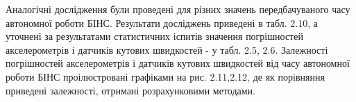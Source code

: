 Аналогічні дослідження були проведені для різних значень передбачуваного часу автономної роботи БІНС. 
Результати досліджень приведені в табл. 2.10, а уточнені за результатами статистичних іспитів значення 
погрішностей акселерометрів і датчиків кутових швидкостей - у табл. 2.5, 2.6. Залежності  погрішностей 
акселерометрів і датчиків кутових швидкостей від часу автономної роботи БІНС проілюстровані графіками на 
рис. 2.11,2.12, де як порівняння приведені залежності, отримані розрахунковими методами.









